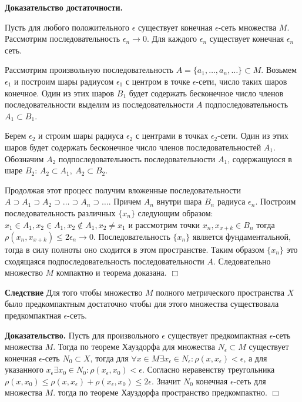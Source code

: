 \documentclass[14pt,a4paper]{extarticle}
\theoremstyle{definition}
\theoremstyle{remark}
\renewcommand{\[}{\begin{dmath*}[compact]}
\renewcommand{\]}{\end{dmath*}}
\newcommand{\sep}{ , \ \allowbreak }
\newcommand{\btev}[1][]{\textbf{Доказательство#1.}
}
\newcommand{\etev}{$\Box$}
\begin{document}
\btev[ достаточности]
  Пусть для любого положительного $\epsilon$ существует конечная $\epsilon$-сеть множества $M$. Рассмотрим последовательность $\epsilon_n \to 0$. Для каждого $\epsilon_n$ существует конечная $\epsilon_n$ сеть.

  Рассмотрим произвольную последовательность $A=\{a_{1},\dots,a_n,\dots\}\subset M$. Возьмем $\epsilon_1$ и построим шары радиусом $\epsilon_1$ с центром в точке $\epsilon$-сети, число таких шаров конечное. Один из этих шаров $B_1$ будет содержать бесконечное число членов последовательности выделим из последовательности $A$ подпоследовательность $A_1\subset B_1$.

  Берем $\epsilon_2$ и строим шары радиуса $\epsilon_2$ с центрами в точках $\epsilon_2$-сети. Один из этих шаров будет содержать бесконечное число членов последовательностей $A_1$. Обозначим $A_2$ подпоследовательность последовательности $A_1$, содержащуюся в шаре $B_2$: $A_2\subset A_1\sep A_2\subset B_2$.

  Продолжая этот процесс получим вложенные последовательности $A\supset A_1\supset A_2\supset \dots\supset A_n\supset \dots$. Причем $A_n$ внутри шара $B_n$ радиуса $\epsilon_n$. Построим последовательность различных $\{x_n\}$ следующим образом: $x_1 \in A_1, x_2 \in A_1, x_2 \not\in A_1, x_2 \neq x_1$ и рассмотрим точки $x_n, x_{x+k} \in B_n$ тогда $\rho(x_n,x_{x+k})\leq 2 \epsilon_n \to 0$. Последовательность $\{x_n\}$ является фундаментальной, тогда в силу полноты оно сходится в этом пространстве. Таким образом $\{x_n\}$ это сходящаяся подпоследовательность последовательности $A$. Следовательно множество $M$ компактно и теорема доказана.
\etev

\textbf{Следствие} Для того чтобы множество $M$ полного метрического пространства $X$ было предкомпактным достаточно чтобы для этого множества существовала предкомпактная $\epsilon$-сеть.

\btev[] Пусть для произвольного $\epsilon$ существует предкомпактная $\epsilon$-сеть множества $M$. Тогда по теореме Хауздорфа для множества $N_\epsilon \subset M$ существует конечная $\epsilon$-сеть $N_0 \subset X$, тогда для $\forall x \in M \exists x_\epsilon \in N_\epsilon: \rho(x,x_\epsilon) < \epsilon$, а для указанного $x_\epsilon \exists x_0\in N_0: \rho(x_\epsilon,x_0)<\epsilon$. Согласно неравенству треугольника $\rho(x,x_0)\leq \rho(x,x_\epsilon) + \rho(x_\epsilon,x_0) \leq 2\epsilon$. Значит $N_0$ конечная $\epsilon$-сеть для множества $M$. тогда по теореме Хауздорфа пространство предкомпактно. \etev
\end{document}

